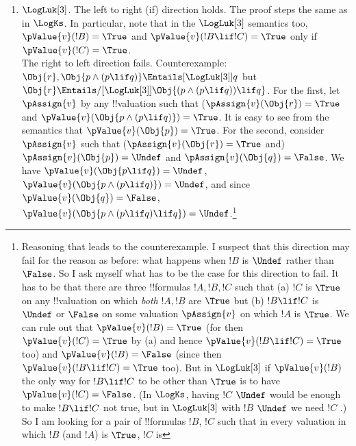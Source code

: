 \documentclass[../../../../include/open-logic-section]{subfiles}
\begin{document}
\begin{prob}
\begin{ans}
\begin{enumerate}
{	So, third, I look for three !!{formula}s $!A$, $!B$,
	$!C$ such that $!B \lif !C$ can be $\Undef$ or $\False$ when $!B$ is
	$\Undef$ (and $!A$ $\True$). But my !!{formula}s should also be such
	that $!C$ is $\True$ when both $!A$ and $!B$ are. A simple solution is
	to let $!B \ident !C \ident \Obj{p}$, since in $\LogKs$ $\Obj{p \lif
	p}$ is $\Undef$ when $\Obj{p}$ is.}
\item $\LogLuk[3]$.  The left to right (if) direction holds. The proof steps the
	same as in $\LogKs$. In particular, note that in the
	$\LogLuk[3]$ semantics too, $\pValue{v}(!B)=\True$ and  $\pValue{v}(!B \lif
	!C)=\True$ only if $\pValue{v}(!C)=\True$.\\
	The right to left direction fails. Counterexample: $\Obj{r}, \Obj{p  \land (p
	\lif q)} \Entails[\LogLuk[3]] q$ but $\Obj{r} \Entails/[\LogLuk[3]] \Obj{(p
	\land (p \lif q))\lif q}$. For the first, let $\pAssign{v}$ by any 
	!!{valuation} such that ($\pAssign{v}(\Obj{r})=\True$ and $\pValue{v}(\Obj{p
	\land (p \lif q)})=\True$. It is easy to see from the semantics that
	$\pValue{v}(\Obj{p})=\True$. For the second, consider $\pAssign{v}$ such that
	($\pAssign{v}(\Obj{r})=\True$ and) $\pAssign{v}(\Obj{p})=\Undef$ and 
	$\pAssign{v}(\Obj{q})=\False$. We have $\pValue{v}(\Obj{p \lif q})=\Undef$,
	$\pValue{v}(\Obj{p\land (p \lif q)})=\Undef$, and since $\pValue{v}(\Obj{q})=\False$, $\pValue{v}(\Obj{p\land (p \lif q)\lif q})=\Undef$.\footnote{Reasoning 
	that leads to the counterexample. I suspect that this direction may fail 
	for the reason as before: what happens when $!B$ is $\Undef$ rather than $\False$.
	So I ask myself what has to be the case for this direction to fail. It has to be that there
	are three !!{formula}s $!A,!B,!C$ such that (a) $!C$ is $\True$ on
	any !!{valuation} on which \emph{both} $!A, !B$ are $\True$ but 
	(b) $!B \lif !C$ is $\Undef$ or $\False$ on some valuation $\pAssign{v}$ 
	on which $!A$ is $\True$. We can rule out that $\pValue{v}(!B)=\True$
	(for then $\pValue{v}(!C)=\True$ by (a) and hence $\pValue{v}(!B 
	\lif !C)=\True$ too)
	and $\pValue{v}(!B)=\False$ (since then $\pValue{v}(!B 
	\lif !C)=\True$ too). But in $\LogLuk[3]$ if $\pValue{v}(!B)$ the only 
	way for $!B \lif !C$ to be other than $\True$ is to have 
	$\pValue{v}(!C)=\False$. (In $\LogKs$, having $!C$ $\Undef$ would be enough
	to make $!B\lif !C$ not true, but in $\LogLuk[3]$ with $!B$ $\Undef$ we 
	need $!C$ \False.)\\
	So I am looking for a pair of !!{formula}s $!B$, $!C$ such that
	in every valuation in which $!B$ (and $!A$) is $\True$, $!C$ is 
}
\end{enumerate}
\end{ans}
\end{prob}
\end{document}
